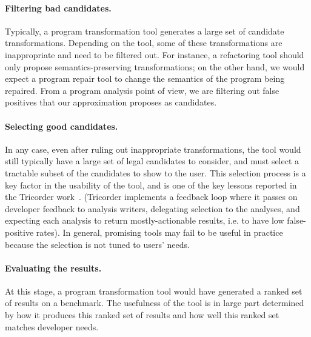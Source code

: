 \paragraph{Filtering bad candidates.} Typically, a
program transformation tool generates a large set of candidate
transformations. Depending on the tool, some of these transformations
are inappropriate and need to be filtered out. For instance, a
refactoring tool should only propose semantics-preserving
transformations; on the other hand, we would expect a program repair
tool to change the semantics of the program being repaired.
From a program analysis point of view, we are filtering out false
positives that our approximation proposes as candidates.

\paragraph{Selecting good candidates.} In any case, even after ruling out 
inappropriate transformations, the tool would still typically have a large
set of legal candidates to consider, and must select a tractable subset of the
candidates to show to the user. This selection process is a key factor
in the usability of the tool, and is one of the key lessons reported
in the Tricorder
work~\cite{sadowski18:_lesson_build_static_analy_tools_googl}.
(Tricorder implements a feedback loop where it passes on developer feedback 
to analysis writers, delegating selection to the analyses, and
expecting each analysis to return mostly-actionable results, i.e.
to have low false-positive rates).
In general, promising tools may fail to be useful in practice because the
selection is not tuned to users' needs.

\paragraph{Evaluating the results.} At this stage, a program
transformation tool would have generated a ranked set of results on a
benchmark. The usefulness of the tool is in large part determined
by how it produces this ranked set of results and how well this ranked set
matches developer needs.







